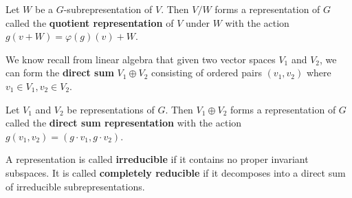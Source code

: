 \begin{defn}
Let $W$ be a $G$-subrepresentation of $V$.  Then $V/W$ forms a representation of $G$ called the \textbf{quotient representation} of $V$ under $W$ with the action $g( v + W) = \varphi(g)(v) + W$.
\end{defn}

We know recall from linear algebra that given two vector spaces $V_1$ and $V_2$, we can form the \textbf{direct sum} $V_1 \oplus V_2$ consisting of ordered pairs $(v_1 ,v_2)$ where $v_1 \in V_1, v_2 \in V_2$.  

\begin{defn}
Let $V_1$ and $V_2$ be representations of $G$.  Then $V_1 \oplus V_2$ forms a representation of $G$ called the \textbf{direct sum representation} with the action $g (v_1, v_2) = (g \cdot  v_1, g \cdot v_2)$.
\end{defn}


\begin{defn}
A representation is called \textbf{irreducible} if it contains no proper invariant subspaces.  It is called \textbf{completely reducible} if it decomposes into a direct sum of irreducible subrepresentations.
\end{defn}

